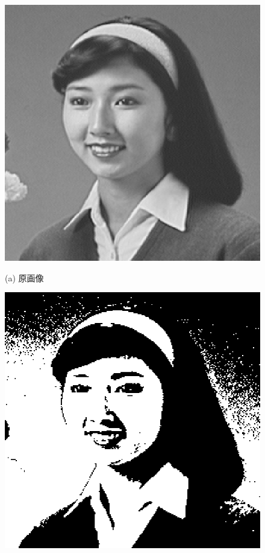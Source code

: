 \begin{figure}[H]
\begin{center}
\begin{minipage}{.4\textwidth}
\begin{center}
\includegraphics[width=.95\textwidth]{fig/hair1.eps}

(a) 原画像
\end{center}
\end{minipage}
\begin{minipage}{.4\textwidth}
\begin{center}
\includegraphics[width=.95\textwidth]{fig/hair1_bin.eps}


\end{center}
\end{minipage}
\end{center}
\end{figure}
